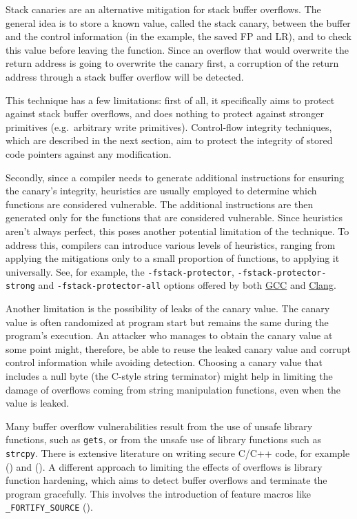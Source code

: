 \documentclass[
  a4paper,
]{report}
\begin{document}
Stack canaries are an alternative mitigation for stack buffer overflows.
The general idea is to store a known value, called the stack canary,
between the buffer and the control information (in the example, the
saved FP and LR), and to check this value before leaving the function.
Since an overflow that would overwrite the return address is going to
overwrite the canary first, a corruption of the return address through a
stack buffer overflow will be detected.

This technique has a few limitations: first of all, it specifically aims
to protect against stack buffer overflows, and does nothing to protect
against stronger primitives (e.g.~arbitrary write primitives).
Control-flow integrity techniques, which are described in the next
section, aim to protect the integrity of stored code pointers against
any modification.

Secondly, since a compiler needs to generate additional instructions for
ensuring the canary's integrity, heuristics are usually employed to
determine which functions are considered vulnerable. The additional
instructions are then generated only for the functions that are
considered vulnerable. Since heuristics aren't always perfect, this
poses another potential limitation of the technique. To address this,
compilers can introduce various levels of heuristics, ranging from
applying the mitigations only to a small proportion of functions, to
applying it universally. See, for example, the
\texttt{-fstack-protector}, \texttt{-fstack-protector-strong} and
\texttt{-fstack-protector-all} options offered by both
\href{https://gcc.gnu.org/onlinedocs/gcc/Instrumentation-Options.html}{GCC}
and
\href{https://clang.llvm.org/docs/ClangCommandLineReference.html\#cmdoption-clang-fstack-protector}{Clang}.

Another limitation is the possibility of leaks of the canary value. The
canary value is often randomized at program start but remains the same
during the program's execution. An attacker who manages to obtain the
canary value at some point might, therefore, be able to reuse the leaked
canary value and corrupt control information while avoiding detection.
Choosing a canary value that includes a null byte (the C-style string
terminator) might help in limiting the damage of overflows coming from
string manipulation functions, even when the value is leaked.

Many buffer overflow vulnerabilities result from the use of unsafe
library functions, such as \texttt{gets}, or from the unsafe use of
library functions such as \texttt{strcpy}. There is extensive literature
on writing secure
\label{__index_entry_12}{C}/\label{__index_entry_13}{C++}
code, for example () and
(). A different
approach to limiting the effects of overflows is library function
hardening, which aims to detect buffer overflows and terminate the
program gracefully. This involves the introduction of feature macros
like \texttt{\_FORTIFY\_SOURCE} ().
\end{document}
